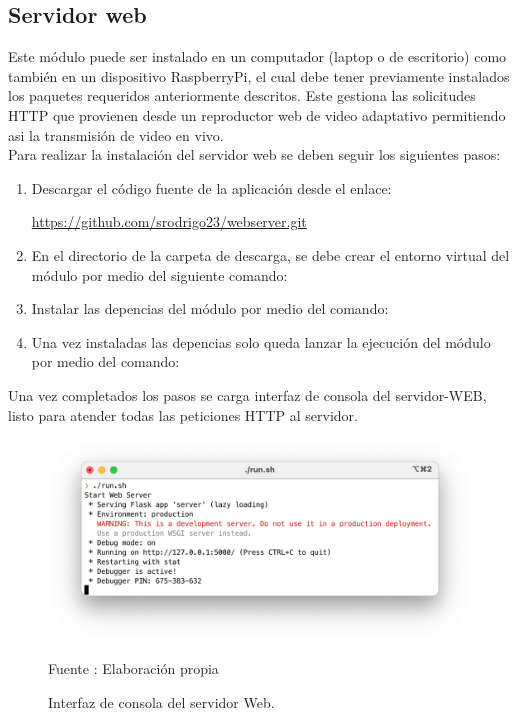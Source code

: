 \subsection*{Servidor web}

Este módulo puede ser instalado en un computador (laptop o de escritorio) como también en un dispositivo RaspberryPi, el cual debe tener previamente instalados los paquetes requeridos anteriormente descritos. Este gestiona las solicitudes HTTP que provienen desde un reproductor web de video adaptativo permitiendo asi la transmisión de video en vivo.\\

Para realizar la instalación del servidor web se deben seguir los siguientes pasos:

\begin{enumerate}
    \item Descargar el código fuente de la aplicación desde el enlace: \begin{center}
        \url{https://github.com/srodrigo23/webserver.git}
    \end{center}
    \item En el directorio de la carpeta de descarga, se debe crear el entorno virtual del módulo por medio del siguiente comando: 
    \begin{center}
    \end{center}
    \item Instalar las depencias del módulo por medio del comando:
    \begin{center}
    \end{center} 
    \item Una vez instaladas las depencias solo queda lanzar la ejecución del módulo por medio del comando:\begin{center}
    \end{center}
\end{enumerate}

Una vez completados los pasos se carga interfaz de consola del servidor-WEB, listo para atender todas las peticiones HTTP al servidor.

\begin{figure}[H]
    \begin{center}
        \includegraphics[width=13cm]{img/anexos/mod_web.png}
        \caption{Interfaz de consola del servidor Web.}
        Fuente : Elaboración propia
    \end{center}
\end{figure}
